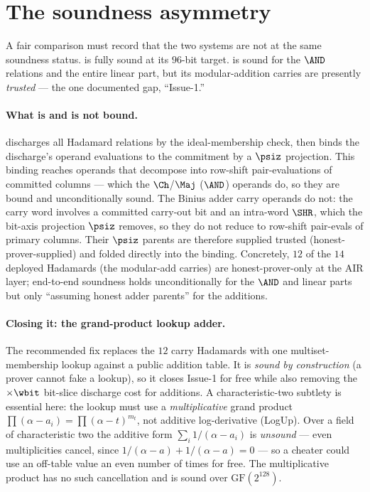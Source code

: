 \section{The soundness asymmetry}
\label{sec:cmp-soundness}

A fair comparison must record that the two systems are not at the same
soundness status. \binius{} is fully sound at its $96$-bit target. \zinc{}
is sound for the $\AND$ relations and the entire linear part, but its
modular-addition carries are presently \emph{trusted} --- the one
documented gap, ``Issue-1.''

\paragraph{What is and is not bound.} \zinc{} discharges all Hadamard
relations by the ideal-membership check, then binds the discharge's operand
evaluations to the commitment by a $\psiz$ projection. This binding
reaches operands that decompose into row-shift pair-evaluations of
committed columns --- which the $\Ch$/$\Maj$ ($\AND$) operands do, so they
are bound and unconditionally sound. The Binius adder carry operands do
not: the carry word involves a committed carry-out bit and an intra-word
$\SHR$, which the bit-axis projection $\psiz$ removes, so they do not
reduce to row-shift pair-evals of primary columns. Their $\psiz$ parents
are therefore supplied trusted (honest-prover-supplied) and folded
directly into the binding. Concretely, $12$ of the $14$ deployed Hadamards
(the modular-add carries) are honest-prover-only at the AIR layer;
end-to-end soundness holds unconditionally for the $\AND$ and linear
parts but only ``assuming honest adder parents'' for the additions.

\paragraph{Closing it: the grand-product lookup adder.} The recommended
fix replaces the $12$ carry Hadamards with one multiset-membership lookup
against a public addition table. It is \emph{sound by construction} (a
prover cannot fake a lookup), so it closes Issue-1 for free while also
removing the $\times\wbit$ bit-slice discharge cost for additions. A
characteristic-two subtlety is essential here: the lookup must use a
\emph{multiplicative} grand product $\prod(\alpha - a_i) = \prod(\alpha -
t)^{m_t}$, not additive log-derivative (LogUp). Over a field of
characteristic two the additive form $\sum_i 1/(\alpha - a_i)$ is
\emph{unsound} --- even multiplicities cancel, since $1/(\alpha-a) +
1/(\alpha-a) = 0$ --- so a cheater could use an off-table value an even
number of times for free. The multiplicative product has no such
cancellation and is sound over $\mathrm{GF}(2^{128})$.

